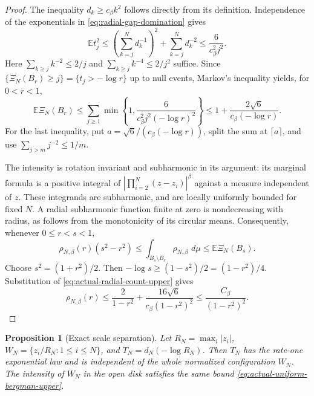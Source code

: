 \documentclass[11pt]{article}
\newcommand{\E}{\mathbb E}
\newcommand{\dd}{\,d}
\newtheorem{proposition}[theorem]{Proposition}
\theoremstyle{remark}\newtheorem{remark}[theorem]{Remark}
\begin{document}
\begin{proof}
The inequality $d_k\ge c_\beta k^2$ follows directly from its
definition. Independence of the exponentials in
\eqref{eq:radial-gap-domination} gives
\[
 \E t_j^2
 \le\left(\sum_{k=j}^N d_k^{-1}\right)^2
       +\sum_{k=j}^N d_k^{-2}
 \le\frac{6}{c_\beta^2j^2}.
\]
Here $\sum_{k\ge j}k^{-2}\le2/j$ and
$\sum_{k\ge j}k^{-4}\le2/j^2$ suffice. Since
$\{\Xi_N(B_r)\ge j\}=\{t_j> -\log r\}$ up to null events,
Markov's inequality yields, for $0<r<1$,
\begin{equation}\label{eq:actual-radial-count-upper}
 \E\Xi_N(B_r)
 \le\sum_{j\ge1}\min\left\{1,
       \frac{6}{c_\beta^2j^2(-\log r)^2}\right\}
 \le1+\frac{2\sqrt6}{c_\beta(-\log r)}.
\end{equation}
For the last inequality, put $a=\sqrt6/(c_\beta(-\log r))$,
split the sum at $\lceil a\rceil$, and use
$\sum_{j>m}j^{-2}\le1/m$.

The intensity is rotation invariant and subharmonic in its argument:
its marginal formula is a positive integral of
$|\prod_{i=2}^N(z-z_i)|^\beta$ against a measure independent of $z$.
These integrands are subharmonic, and are locally uniformly bounded
for fixed $N$. A radial subharmonic function finite at zero is
nondecreasing with radius, as follows from the monotonicity of its
circular means. Consequently, whenever $0\le r<s<1$,
\[
 \rho_{N,\beta}(r)(s^2-r^2)
 \le\int_{B_s\setminus B_r}\rho_{N,\beta}\,\dd\mu
 \le\E\Xi_N(B_s).
\]
Choose $s^2=(1+r^2)/2$. Then
$-\log s\ge(1-s^2)/2=(1-r^2)/4$. Substitution of
\eqref{eq:actual-radial-count-upper} gives
\[
 \rho_{N,\beta}(r)
 \le\frac2{1-r^2}
       +\frac{16\sqrt6}{c_\beta(1-r^2)^2}
 \le\frac{C_\beta}{(1-r^2)^2}.
\]
\end{proof}

\begin{proposition}[Exact scale separation]
\label{prop:exact-scale-separation}
Let $R_N=\max_i|z_i|$, $W_N=\{z_i/R_N:1\le i\le N\}$, and
$T_N=d_N(-\log R_N)$. Then $T_N$ has the rate-one exponential
law and is independent of the whole normalized configuration $W_N$.
The intensity of $W_N$ in the open disk satisfies the same bound
\eqref{eq:actual-uniform-bergman-upper}.
\end{proposition}
\end{document}
